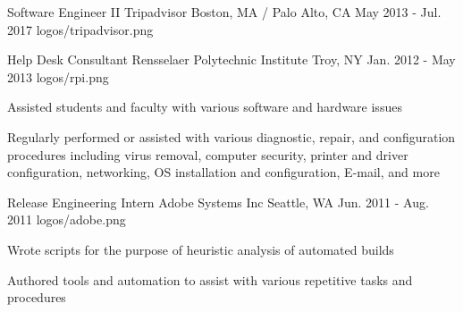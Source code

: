 
\begin{cvexps}


\cvexp
    {Software Engineer II} %
    {Tripadvisor} %
    {Boston, MA / Palo Alto, CA} %
    {May 2013 - Jul. 2017} %
    {logos/tripadvisor.png} %
    { %
        \begin{cvitems}
            \item{}
        \end{cvitems}
    }


\cvexp
    {Help Desk Consultant} %
    {Rensselaer Polytechnic Institute} %
    {Troy, NY} %
    {Jan. 2012 - May 2013} %
    {logos/rpi.png} %
    { %
        \begin{cvitems}
            \item{Assisted students and faculty with various software and hardware issues}
            \item{Regularly performed or assisted with various diagnostic, repair, and configuration procedures including virus removal, computer security, printer and driver configuration, networking, OS installation and configuration, E-mail, and more}
        \end{cvitems}
    }


\cvexp
    {Release Engineering Intern} %
    {Adobe Systems Inc} %
    {Seattle, WA} %
    {Jun. 2011 - Aug. 2011} %
    {logos/adobe.png} %
    { %
        \begin{cvitems}
            \item{Wrote scripts for the purpose of heuristic analysis of automated builds}
            \item{Authored tools and automation to assist with various repetitive tasks and procedures}
        \end{cvitems}
    }

\end{cvexps}